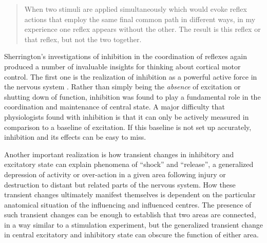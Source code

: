 \blockquote[{\protect\cite[p.461]{Sherrington1904}}]{When two stimuli are applied simultaneously which would evoke reflex actions that employ the same final common path in different ways, in my experience one reflex appears without the other. The result is this reflex or that reflex, but not the two together.}

Sherrington's investigations of inhibition in the coordination of reflexes again produced a number of invaluable insights for thinking about cortical motor control. The first one is the realization of inhibition as a powerful active force in the nervous system \cite{Sherrington1965}. Rather than simply being the \emph{absence} of excitation or shutting down of function, inhibition was found to play a fundamental role in the coordination and maintenance of central state. A major difficulty that physiologists found with inhibition is that it can only be actively measured in comparison to a baseline of excitation. If this baseline is not set up accurately, inhibition and its effects can be easy to miss.

Another important realization is how transient changes in inhibitory and excitatory state can explain phenomena of ``shock'' and ``release'', a generalized depression of activity or over-action in a given area following injury or destruction to distant but related parts of the nervous system. How these transient changes ultimately manifest themselves is dependent on the particular anatomical situation of the influencing and influenced centres. The presence of such transient changes can be enough to establish that two areas are connected, in a way similar to a stimulation experiment, but the generalized transient change in central excitatory and inhibitory state can obscure the function of either area.



